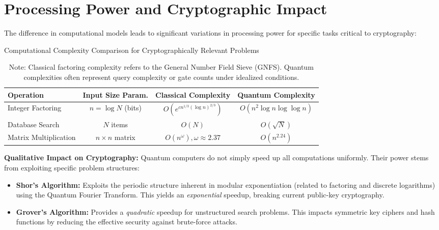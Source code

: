 \section{Processing Power and Cryptographic Impact}\label{sec:processing_and_crypto_impact}

The difference in computational models leads to significant variations in processing power for specific tasks critical to cryptography:

\begin{table}[h]
    \centering
    \caption{Computational Complexity Comparison for Cryptographically Relevant Problems}
    \label{tab:computing_power_ch4}
    \begin{tabular}{@{}lccc@{}}
        \toprule
        \textbf{Operation} & \textbf{Input Size Param.} & \textbf{Classical Complexity} & \textbf{Quantum Complexity} \\
        \midrule
        Integer Factoring & $n = \log N$ (bits) & $O(e^{c n^{1/3}(\log n)^{2/3}})$ & $O(n^2 \log n \log\log n)$ \\
        Database Search & $N$ items & $O(N)$ & $O(\sqrt{N})$ \\
        Matrix Multiplication & $n \times n$ matrix & $O(n^\omega), \omega \approx 2.37$ & $O(n^{2.24})$ \\
        \bottomrule
    \end{tabular}
    \caption*{Note: Classical factoring complexity refers to the General Number Field Sieve (GNFS). Quantum complexities often represent query complexity or gate counts under idealized conditions.}
\end{table}

\textbf{Qualitative Impact on Cryptography:} Quantum computers do not simply speed up all computations uniformly. Their power stems from exploiting specific problem structures:
\begin{itemize}
    \item \textbf{Shor's Algorithm:} Exploits the periodic structure inherent in modular exponentiation (related to factoring and discrete logarithms) using the Quantum Fourier Transform. This yields an \textit{exponential} speedup, breaking current public-key cryptography.
    \item \textbf{Grover's Algorithm:} Provides a \textit{quadratic} speedup for unstructured search problems. This impacts symmetric key ciphers and hash functions by reducing the effective security against brute-force attacks.
\end{itemize}

